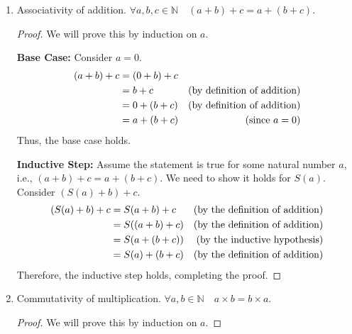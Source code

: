 \documentclass[10pt]{article}
\newcommand{\N}{\mathbb{N}}
\newenvironment{problem}[2][Problem]{\begin{trivlist}
\item[\hskip \labelsep {\bfseries #1}\hskip \labelsep {\bfseries #2.}]}{\end{trivlist}}
\begin{document}
\begin{problem}{1}
\begin{enumerate}
\begin{enumerate}
                \item Associativity of addition. $ \forall a,b,c \in \N \quad (a+b)+c=a+(b+c) $.
                    \begin{proof}
                        We will prove this by induction on $a$.

                        \textbf{Base Case:} Consider \( a = 0 \).
                        \begin{align*}
                            (a + b) + c &= (0 + b) + c &  \\
                                        &= b + c & \text{(by definition of addition)} \hfill \\
                                        &= 0 + (b + c) & \text{(by definition of addition)} \hfill \\
                                        &= a + (b + c) & \text{(since \( a = 0 \))} \hfill
                        \end{align*}
                        Thus, the base case holds.

                        \textbf{Inductive Step:} Assume the statement is true for some natural number \( a \), i.e., \( (a + b) + c = a + (b + c) \). We need to show it holds for \( S(a) \).
                        Consider \( (S(a) + b) + c \).
                        \begin{align*}
                            (S(a) + b) + c &= S(a+b) + c & \text{(by the definition of addition)} \hfill \\
                                           &= S((a+b) + c) & \text{(by the definition of addition)} \hfill \\
                                           &= S(a + (b + c)) & \text{(by the inductive hypothesis)} \hfill \\
                                           &= S(a) + (b + c) & \text{(by the definition of addition)} \hfill
                        \end{align*}
                        Therefore, the inductive step holds, completing the proof.
                    \end{proof}

				\item Commutativity of multiplication. $ \forall a,b \in \N \quad a \times b = b \times a $.

                    \begin{proof}
                        We will prove this by induction on \( a \).


\end{proof}
\end{enumerate}
\end{enumerate}
\end{problem}
\end{document}
